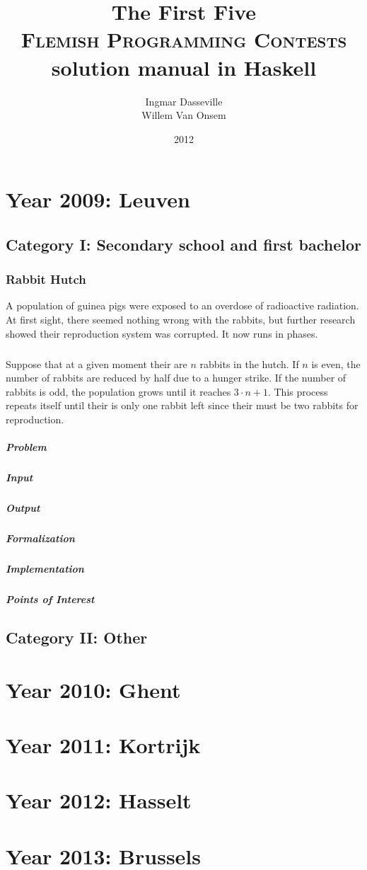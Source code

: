 \documentclass{book}
\title{The First Five\\\textsc{Flemish Programming Contests}\\solution manual in Haskell}
\author{Ingmar Dasseville\\Willem Van Onsem}
\date{2012}
\begin{document}
\begin{titlepage}
\maketitle
\end{titlepage}
\tableofcontents
\chapter{Year 2009: Leuven}
\section{Category I: Secondary school and first bachelor}
\subsection{Rabbit Hutch}
A population of guinea pigs were exposed to an overdose of radioactive radiation. At first sight, there seemed nothing wrong with the rabbits, but further research showed their reproduction system was corrupted. It now runs in phases.
\paragraph{}
Suppose that at a given moment their are $n$ rabbits in the hutch. If $n$ is even, the number of rabbits are reduced by half due to a hunger strike. If the number of rabbits is odd, the population grows until it reaches $3\cdot n+1$. This process repeats itself until their is only one rabbit left since their must be two rabbits for reproduction.
\paragraph{Problem}
\paragraph{Input}
\paragraph{Output}
\paragraph{Formalization}
\paragraph{Implementation}
\paragraph{Points of Interest}
\section{Category II: Other}
\chapter{Year 2010: Ghent}
\chapter{Year 2011: Kortrijk}
\chapter{Year 2012: Hasselt}
\chapter{Year 2013: Brussels}
\end{document}
